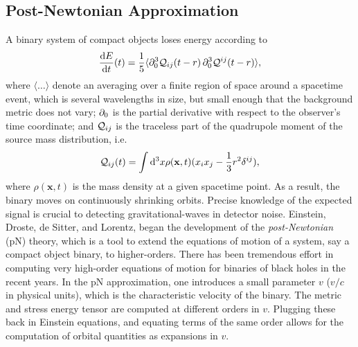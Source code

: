 \subsection{Post-{N}ewtonian Approximation}
\label{sec:PNWaveforms}

A binary system of compact objects loses energy according to 
%
\begin{equation}
\label{eq:energy_loss}
\frac{\D E}{\D t}(t) = \frac{1}{5}\langle \pd_0^3\Quad_{ij}(t-r)\,\pd_0^3\Quad^{ij}(t-r)\rangle,
\end{equation}
%
where $\langle\dots\rangle$ denote an averaging over a finite region
of space around a spacetime event, which is several wavelengths in size,
but small enough that the background metric does not vary;
% 
$\partial_0$ is the partial derivative with respect to the observer's
time coordinate; and $\mathcal{Q}_{ij}$ is the traceless part of the quadrupole 
moment of the source mass distribution, i.e.
%
\begin{equation}
\mathcal{Q}_{ij}(t) = \int \mathrm{d}^3 x \rho(\mathbf{x},t)(x_i x_j - \frac{1}{3}r^2 \delta^{ij}),
\end{equation}
% 
where $\rho(\mathbf{x},t)$ is the mass density at a given spacetime point.
As a result, the binary moves on continuously shrinking orbits.
Precise knowledge of the expected signal is crucial to detecting gravitational-waves
in detector noise. Einstein, Droste, de Sitter, and Lorentz,
began the development of the {\it post-Newtonian} (pN) theory, which is a
tool to extend the equations of motion of a system, say a compact object 
binary, to higher-orders. There has been tremendous effort in computing 
very high-order equations of motion for binaries of black holes in the
recent years. In the pN approximation, one introduces a small parameter 
$v$ ($v/c$ in physical units), which is the characteristic velocity of the binary.
The metric and
stress energy tensor are computed at different orders in 
$v$. Plugging these back in Einstein equations, and equating terms of 
the same order allows for the computation of orbital quantities
as expansions in $v$. 


